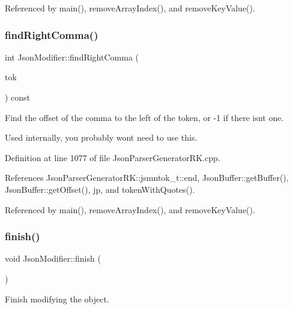 Referenced by main(), remove\+Array\+Index(), and remove\+Key\+Value().

\mbox{\label{class_json_modifier_a24fac4c2257f932aff41792214de35ca}} 
\subsubsection{\texorpdfstring{find\+Right\+Comma()}{findRightComma()}}
{\footnotesize\ttfamily int Json\+Modifier\+::find\+Right\+Comma (\begin{DoxyParamCaption}\item[{const \hyperlink{struct_json_parser_generator_r_k_1_1jsmntok__t}{Json\+Parser\+Generator\+R\+K\+::jsmntok\+\_\+t} $\ast$}]{tok }\end{DoxyParamCaption}) const}



Find the offset of the comma to the left of the token, or -\/1 if there isn\textquotesingle{}t one. 

Used internally, you probably won\textquotesingle{}t need to use this. 

Definition at line 1077 of file Json\+Parser\+Generator\+R\+K.\+cpp.



References Json\+Parser\+Generator\+R\+K\+::jsmntok\+\_\+t\+::end, Json\+Buffer\+::get\+Buffer(), Json\+Buffer\+::get\+Offset(), jp, and token\+With\+Quotes().



Referenced by main(), remove\+Array\+Index(), and remove\+Key\+Value().

\mbox{\label{class_json_modifier_ae531232fa98f72eea8ea6ba07c065497}} 
\subsubsection{\texorpdfstring{finish()}{finish()}}
{\footnotesize\ttfamily void Json\+Modifier\+::finish (\begin{DoxyParamCaption}{ }\end{DoxyParamCaption})}



Finish modifying the object. 

